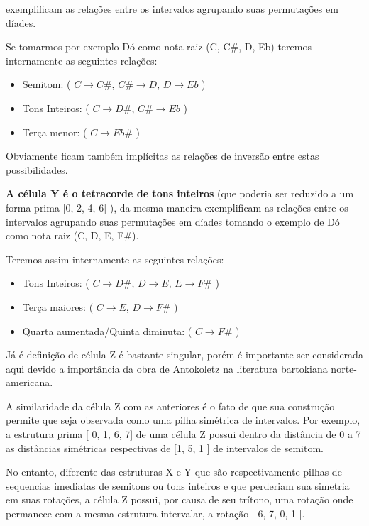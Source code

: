 \documentclass[
	12pt,				%
	openright,			%
	twoside,			%
	a4paper,			%
	english,			%
	french,				%
	spanish,			%
	brazil				%
	]{abntex2}
\begin{document}
 exemplificam as relações entre os intervalos agrupando suas permutações em díades.

Se tomarmos por exemplo Dó como nota raiz (C, C\#, D, Eb) teremos internamente as seguintes relações:


\begin{itemize}
\item Semitom: ( $C \rightarrow C\#$, $C\# \rightarrow D$, $D \rightarrow Eb$ ) 

\item Tons Inteiros: ( $C \rightarrow D\#$, $C\# \rightarrow Eb$ )

\item Terça menor: ( $C \rightarrow Eb\#$ )
\end{itemize}

Obviamente ficam também implícitas as relações de inversão entre estas possibilidades.

\textbf{A célula Y é o tetracorde de tons inteiros} (que poderia ser reduzido a um forma prima [0, 2, 4, 6] ), da mesma maneira  exemplificam as relações entre os intervalos agrupando suas permutações em díades tomando o exemplo de Dó como nota raiz (C, D, E, F\#). 

Teremos assim internamente as seguintes relações:

\begin{itemize}
\item Tons Inteiros: ( $C \rightarrow D\#$, $D \rightarrow E$, $E \rightarrow F\#$ ) 

\item Terça maiores: ( $C \rightarrow E$, $D \rightarrow F\#$ )

\item Quarta aumentada/Quinta diminuta: ( $C \rightarrow F\#$ )
\end{itemize}


Já é definição de célula Z é bastante singular, porém é importante ser considerada aqui devido a importância da obra de Antokoletz na literatura bartokiana norte-americana. 

A similaridade da célula Z com as anteriores é o fato de que sua construção permite que seja observada como uma pilha simétrica de intervalos. Por exemplo, a estrutura prima [ 0, 1, 6, 7] de uma célula Z possui dentro da distância de 0 a 7 as distâncias simétricas respectivas de [1, 5, 1 ] de intervalos de semitom. 

No entanto, diferente das estruturas X e Y que são respectivamente pilhas de sequencias imediatas de semitons ou tons inteiros e que perderiam sua simetria em suas rotações, a célula Z possui, por causa de seu trítono, uma rotação onde permanece com a mesma estrutura intervalar, a rotação [ 6, 7, 0, 1 ]. 
\end{document}
